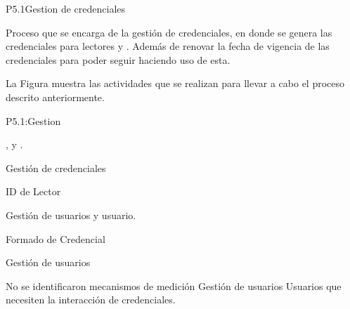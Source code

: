 
\begin{Proceso}{P5.1}{Gestion de credenciales} {
  

  Proceso que se encarga de la gestión de credenciales, en donde se genera las credenciales para lectores  y . Además de renovar la fecha de vigencia de las credenciales para poder seguir haciendo uso de esta.


  \noindent La Figura  muestra las actividades que se realizan para llevar a cabo el proceso descrito anteriormente.


} {P5.1:Gestion}


   { %
    ,  y .
  }

   { %
    Gestión de credenciales
  }

   { %
      ID de Lector
  }
  
   { %
    Gestión de usuarios y usuario.
  }

   { %
    Formado de Credencial
  }

   { %
    Gestión de usuarios
  }

   { %
    No se identificaron mecanismos de medición
  }
   { %
    Gestión de usuarios
  }
   { %
    Usuarios que necesiten la interacción de credenciales.
  }


\end{Proceso}

